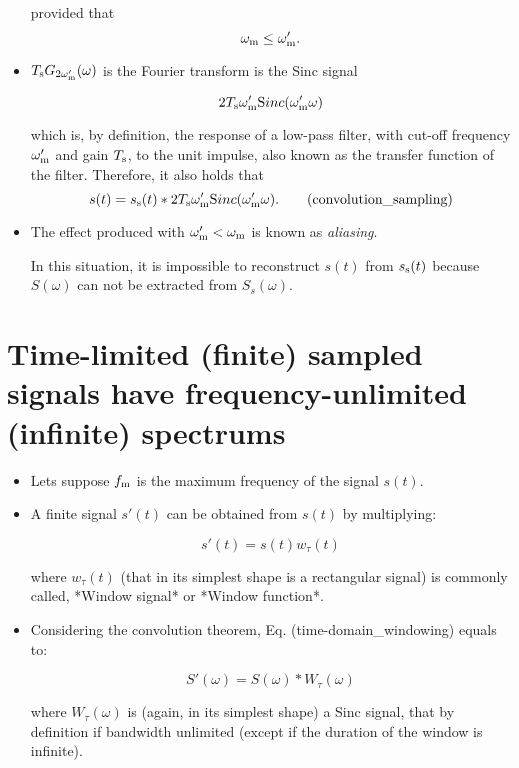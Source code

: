\begin{itemize}

  provided that $$\omega_{\text m}\leq \omega_{\text m}'.$$

\item $T_{\text s}G_{2\omega_{\text m}'}(\omega)$ is the Fourier transform is the Sinc signal

  \begin{equation}
    2T_{\text s}\omega_{\text m}'{\text Sinc}(\omega_{\text m}'\omega)
  \end{equation}

  which is, by definition, the response of a low-pass filter, with cut-off frequency $\omega_{\text m}'$ and gain $T_{\text s}$, to the unit impulse, also known as the transfer function of the filter. Therefore, it also holds that
  \begin{equation}
    s(t) = s_{\text s}(t)*2T_{\text s}\omega_{\text m}'{\text Sinc}(\omega_{\text m}'\omega).
    \tag{convolution\_sampling}
  \end{equation}

\item The effect produced with $\omega_{\text m}' < \omega_{\text m}$ is
  known as \emph{aliasing}.  


  In this situation, it is impossible to reconstruct $s(t)$ from $s_{\text s}(t)$ because $S(\omega)$ can not be extracted from $S_s(\omega)$.

\end{itemize}

\section{Time-limited (finite) sampled signals have frequency-unlimited (infinite) spectrums}
\begin{itemize}
\item Lets suppose $f_{\text m}$ is the maximum frequency of the signal $s(t)$.

\item A finite signal $s'(t)$ can be obtained from $s(t)$ by multiplying:

  \begin{equation}
    s'(t) = s(t)w_\tau(t)
    \tag{time-domain\_windowing}
  \end{equation}

  where $w_\tau(t)$ (that in its simplest shape is a rectangular signal) is commonly called, *Window signal* or *Window function*.

\item Considering the convolution theorem, Eq. (time-domain\_windowing) equals to:

  \begin{equation}
    S'(\omega) = S(\omega)*W_\tau(\omega)
    \tag{frequency-domain\_windowing}
  \end{equation}

  where $W_\tau(\omega)$ is (again, in its simplest shape) a Sinc
  signal, that by definition if bandwidth unlimited (except if the
  duration of the window is infinite).
\end{itemize}


